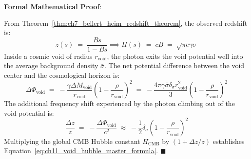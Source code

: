 \documentclass[
    12pt,
    a4paper,
    headings=normal,
    twoside=false,
    open=any,
    parskip=half
]{scrbook}
\newenvironment{myproof}[1][]{%
  \par\vspace{6pt}\noindent\textbf{\sffamily\color{maincolor}Formal Mathematical Proof\ifstrempty{#1}{}{ (#1)}}:\par\nopagebreak
}{%
  \penalty50\hfill\ensuremath{\blacksquare}\par\vspace{6pt}
}
\begin{document}
\begin{myproof}
From Theorem~\ref{thm:ch7_bellert_heim_redshift_theorem}, the observed redshift is:
\begin{equation*}
z(s) \;=\; \frac{B s}{1 - B s} \implies H(s) \;=\; c B \;=\; \sqrt{\pi e \gamma \sigma}
\end{equation*}
Inside a cosmic void of radius $r_{\text{void}}$, the photon exits the void potential well into the average background density $\bar{\sigma}$. The net potential difference between the void center and the cosmological horizon is:
\begin{equation*}
\Delta\Phi_{\text{void}} \;=\; -\frac{\gamma \Delta M_{\text{void}}}{r_{\text{void}}} \left( 1 - \frac{\rho}{r_{\text{void}}} \right)^2 \;=\; -\frac{4\pi\gamma \bar{\sigma} \delta_\sigma r_{\text{void}}^2}{3} \left( 1 - \frac{\rho}{r_{\text{void}}} \right)^2
\end{equation*}
The additional frequency shift experienced by the photon climbing out of the void potential is:
\begin{equation*}
\frac{\Delta z}{z} \;=\; -\frac{\Delta\Phi_{\text{void}}}{c^2} \;\approx\; -\frac{1}{2} \delta_\sigma \left( 1 - \frac{\rho}{r_{\text{void}}} \right)^2
\end{equation*}
Multiplying the global CMB Hubble constant $H_{\text{CMB}}$ by $(1 + \Delta z/z)$ establishes Equation~\eqref{eq:ch11_void_hubble_master_formula}.
\end{myproof}
\end{document}
